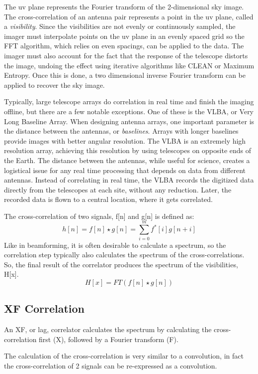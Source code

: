 \cite{Thompson:1986ww}

The uv plane represents the Fourier transform of the 2-dimensional sky image. 
The cross-correlation of an antenna pair represents a point in the uv plane, called a \emph{visibility}. 
Since the visibilities are not evenly or continuously sampled, the imager must interpolate points on the uv plane in an evenly spaced grid so the FFT algorithm, which relies on even spacings, can be applied to the data. 
The imager must also account for the fact that the response of the telescope distorts the image, undoing the effect using iterative algorithms like CLEAN or Maximum Entropy. 
Once this is done, a two dimensional inverse Fourier transform can be applied to recover the sky image. 

Typically, large telescope arrays do correlation in real time and finish the imaging offline, but there are a few notable exceptions.
One of these is the VLBA, or Very Long Baseline Array. 
When designing antenna arrays, one important parameter is the distance between the antennas, or \emph{baselines}. 
Arrays with longer baselines provide images with better angular resolution. 
The VLBA is an extremely high resolution array, achieving this resolution by using telescopes on opposite ends of the Earth. 
The distance between the antennas, while useful for science, creates a logistical issue for any real time processing that depends on data from different antennas. 
Instead of correlating in real time, the VLBA records the digitized data directly from the telescopes at each site, without any reduction.
Later, the recorded data is flown to a central location, where it gets correlated.

The cross-correlation of two signals, f[n] and g[n] is defined as:
\[h[n] = f[n]\star g[n] = \sum_{i=0}^m f^*[i]g[n+i]\]
Like in beamforming, it is often desirable to calculate a spectrum, so the correlation step typically also calculates the spectrum of the cross-correlations. 
So, the final result of the correlator produces the spectrum of the visibilities, H[x].
\[H[x] = FT(f[n]\star g[n])\]


\subsection{XF Correlation}
An XF, or lag, correlator calculates the spectrum by calculating the cross-correlation first (X), followed by a Fourier transform (F).

The calculation of the cross-correlation is very similar to a convolution, in fact the cross-correlation of 2 signals can be re-expressed as a convolution. 
\[\]
\[\]

